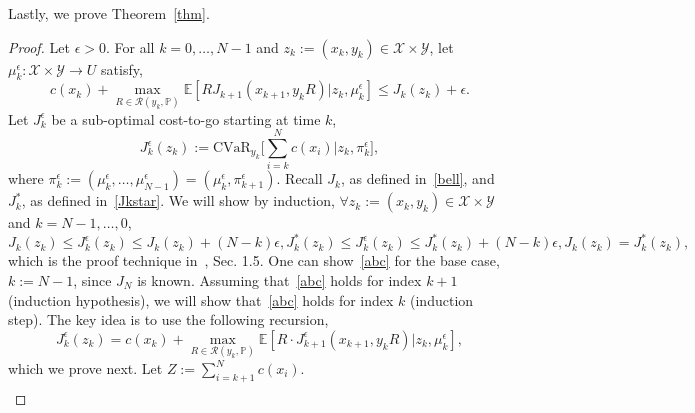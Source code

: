 \documentclass[letterpaper, 10 pt, conference]{ieeeconf}  %
\begin{document}
Lastly, we prove Theorem~\ref{thm}.\\
\begin{proof}
Let $\epsilon > 0$. For all $k = 0, \dots, N-1$ and $z_k := (x_k, y_k) \in \mathcal{X} \times \mathcal{Y}$, let $\mu_k^\epsilon : \mathcal{X} \times \mathcal{Y} \to U$ satisfy,
%
\begin{equation} 
c(x_k) + {\underset{R \in \mathcal{R}(y_k, \mathbb{P})}\max} \mathbb{E}[ RJ_{k+1}(x_{k+1}, y_k R) | z_k, \mu_k^\epsilon] \leq J_k(z_k) + \epsilon.
\label{first}\end{equation} 
%
Let $J_k^\epsilon$ be a sub-optimal cost-to-go starting at time $k$,
%
\begin{equation} 
J_k^\epsilon(z_k) := \text{CVaR}_{y_k}\big[\textstyle \sum_{i=k}^N c(x_i) \big| z_k, \pi_k^\epsilon \big],
\label{Jkeps}\end{equation}
%
where $\pi_k^\epsilon := (\mu_k^\epsilon,\dots,\mu_{N-1}^\epsilon) = (\mu_k^\epsilon, \pi_{k+1}^\epsilon)$. Recall $J_k$, as defined in~\eqref{bell}, and $J_k^*$, as defined in~\eqref{Jkstar}.
We will show by induction, $\forall z_k := (x_k, y_k) \in \mathcal{X} \times \mathcal{Y}$ and $k = N-1, \dots, 0$,
%
\begin{subequations}\label{abc}
\begin{equation}
J_k(z_k) \leq J_k^\epsilon(z_k) \leq J_k(z_k) + (N-k)\epsilon, 
\label{a}\end{equation}
%
\begin{equation}
J_k^*(z_k) \leq J_k^\epsilon(z_k) \leq J_k^*(z_k) + (N-k)\epsilon, 
\label{b}\end{equation}
%
\begin{equation}
J_k(z_k) = J_k^*(z_k), 
\label{c}\end{equation}
\end{subequations}
%
which is the proof technique in~\cite{bertsekas2005dynamic}, Sec. 1.5. 
One can show~\eqref{abc} for the base case, $k := N-1$, since $J_N$ is known.
Assuming that~\eqref{abc} holds for index $k+1$ (induction hypothesis), we will show that~\eqref{abc} holds for index $k$ (induction step). The key 
idea is to use the following recursion,
%
\begin{equation}
J_k^\epsilon(z_k) = c(x_k) + {\underset{R \in \mathcal{R}(y_k, \mathbb{P})}\max} \mathbb{E}[ R\cdot J^\epsilon_{k+1}(x_{k+1}, y_k R) | z_k, \mu_k^\epsilon],
\label{Jkepsrec}\end{equation}
%
which we prove next. Let $Z := \sum_{i=k+1}^N c(x_i)$. 
%
\begin{equation*}\begin{aligned}

\end{aligned}
\end{equation*}
\end{proof}
\end{document}
